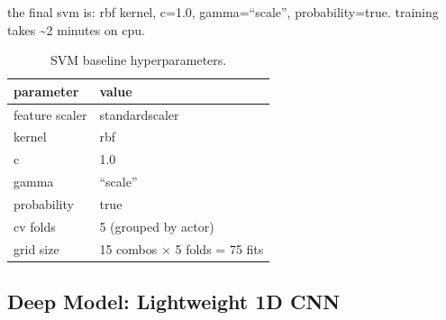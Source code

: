 \documentclass[conference]{IEEEtran}
\begin{document}
the final svm is: rbf kernel, c=1.0, gamma=``scale'', probability=true.
training takes \textasciitilde2 minutes on cpu.

\begin{table}[h!]
\centering
\caption{SVM baseline hyperparameters.}
\label{tab:svm-hyperparams}
\begin{tabular}{@{}ll@{}}
\toprule
parameter & value \\
\midrule
feature scaler & standardscaler \\
kernel & rbf \\
c & 1.0 \\
gamma & ``scale'' \\
probability & true \\
cv folds & 5 (grouped by actor) \\
grid size & 15 combos $\times$ 5 folds = 75 fits \\
\bottomrule
\end{tabular}
\end{table}
\subsection{Deep Model: Lightweight 1D CNN}\label{deep-model-lightweight-1d-cnn}
\end{document}
